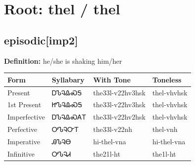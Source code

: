 \documentclass{article}%
\begin{document}
%
\normalsize%
\section*{Root: thel / thel}%
\subsection*{episodic[imp2]}%
\textbf{Definition: }%
he/she is shaking him/her%
\\[0.5em]%
\begin{tabular}{|l|l|l|l|}%
\hline%
\textbf{Form}&\textbf{Syllabary}&\textbf{With Tone}&\textbf{Toneless}\\%
\hline%
Present&ᎠᏖᎸᎲᏍᎦ&the33l{-}v22hv3hsk&thel{-}vhvhsk\\%
1st Present&ᏥᏖᎸᎲᏍᎦ&the33l{-}v22hv3hsk&thel{-}vhvhsk\\%
Imperfective&ᎠᏖᎸᎲᏍᎪᎢ&the33l{-}v22hv2hsk&thel{-}vhvhsk\\%
Perfective&ᎤᏖᎸᏅᎢ&the33l{-}v22nh&thel{-}vnh\\%
Imperative&ᎯᏖᎸᎾ&hi{-}thel{-}vna&hi{-}thel{-}vna\\%
Infinitive&ᎤᏖᎸᏗ&the21l{-}ht&the1l{-}ht\\%
\hline%
\end{tabular}%
\\[1em]%
\end{document}
